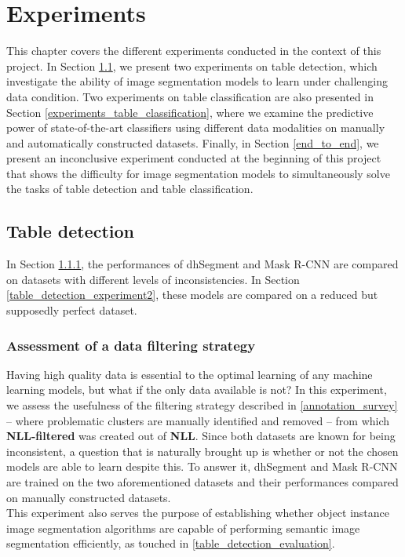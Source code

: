 \chapter{Experiments}
\label{experiments}
This chapter covers the different experiments conducted in the context of this project. In Section \ref{experiments_table_detection}, we present two experiments on table detection, which investigate the ability of image segmentation models to learn under challenging data condition. Two experiments on table classification are also presented in Section \ref{experiments_table_classification}, where we examine the predictive power of state-of-the-art classifiers using different data modalities on manually and automatically constructed datasets. Finally, in Section \ref{end_to_end}, we present an inconclusive experiment conducted at the beginning of this project that shows the difficulty for image segmentation models to simultaneously solve the tasks of table detection and table classification.

\section{Table detection}
\label{experiments_table_detection}
In Section \ref{table_detection_experiment1}, the performances of dhSegment and Mask R-CNN are compared on datasets with different levels of inconsistencies. In Section \ref{table_detection_experiment2}, these models are compared on a reduced but supposedly perfect dataset.

\subsection{Assessment of a data filtering strategy}
\label{table_detection_experiment1}
Having high quality data is essential to the optimal learning of any machine learning models, but what if the only data available is not? In this experiment, we assess the usefulness of the filtering strategy described in \ref{annotation_survey} -- where problematic clusters are manually identified and removed -- from which \textbf{NLL-filtered} was created out of \textbf{NLL}. Since both datasets are known for being inconsistent, a question that is naturally brought up is whether or not the chosen models are able to learn despite this. To answer it, dhSegment and Mask R-CNN are trained on the two aforementioned datasets and their performances compared on manually constructed datasets.\\
This experiment also serves the purpose of establishing whether object instance image segmentation algorithms are capable of performing semantic image segmentation efficiently, as touched in \ref{table_detection_evaluation}.


